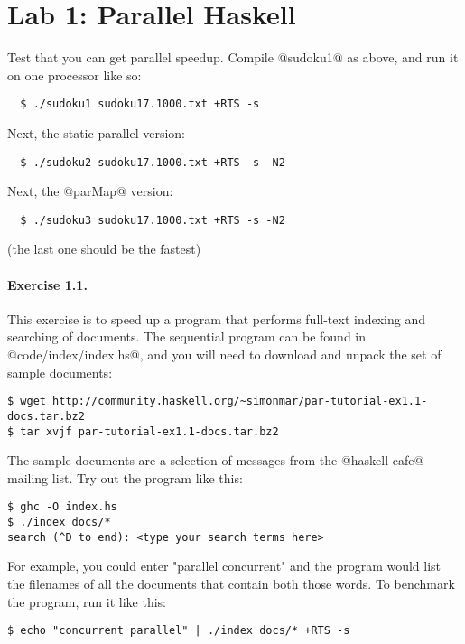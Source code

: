 \documentclass[11pt,a4paper]{article}
\newcommand{\Section}[2]{\section{#2}\label{sec:#1}}
\begin{document}
\newpage\Section{par}{Lab 1: Parallel Haskell}

Test that you can get parallel speedup.  Compile @sudoku1@ as above,
and run it on one processor like so:

{\small \begin{verbatim}
  $ ./sudoku1 sudoku17.1000.txt +RTS -s
\end{verbatim}}

\noindent Next, the static parallel version:

{\small \begin{verbatim}
  $ ./sudoku2 sudoku17.1000.txt +RTS -s -N2
\end{verbatim}}

\noindent Next, the @parMap@ version:

{\small \begin{verbatim}
  $ ./sudoku3 sudoku17.1000.txt +RTS -s -N2
\end{verbatim}}

\noindent (the last one should be the fastest)

\paragraph{Exercise 1.1.} This exercise is to speed up a program that
performs full-text indexing and searching of documents.  The
sequential program can be found in @code/index/index.hs@, and you will
need to download and unpack the set of sample documents:

\begin{verbatim}
$ wget http://community.haskell.org/~simonmar/par-tutorial-ex1.1-docs.tar.bz2
$ tar xvjf par-tutorial-ex1.1-docs.tar.bz2
\end{verbatim}

The sample documents are a selection of messages from the
@haskell-cafe@ mailing list.  Try out the program like this:

\begin{verbatim}
$ ghc -O index.hs
$ ./index docs/*
search (^D to end): <type your search terms here>
\end{verbatim}

\noindent For example, you could enter "parallel concurrent" and the
program would list the filenames of all the documents that contain
both those words.  To benchmark the program, run it like this:

\begin{verbatim}
$ echo "concurrent parallel" | ./index docs/* +RTS -s
\end{verbatim}
\end{document}
